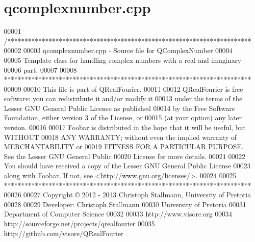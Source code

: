\hypertarget{a00113_source}{\section{qcomplexnumber.\+cpp}
\label{a00113_source}
}

\begin{DoxyCode}
00001 \textcolor{comment}{/***********************************************************************}
00002 \textcolor{comment}{}
00003 \textcolor{comment}{qcomplexnumber.cpp - Source file for QComplexNumber}
00004 \textcolor{comment}{}
00005 \textcolor{comment}{Template class for handling complex numbers with a real and imaginary}
00006 \textcolor{comment}{part. }
00007 \textcolor{comment}{}
00008 \textcolor{comment}{************************************************************************}
00009 \textcolor{comment}{}
00010 \textcolor{comment}{This file is part of QRealFourier.}
00011 \textcolor{comment}{}
00012 \textcolor{comment}{QRealFourier is free software: you can redistribute it and/or modify it}
00013 \textcolor{comment}{under the terms of the Lesser GNU General Public License as published}
00014 \textcolor{comment}{by the Free Software Foundation, either version 3 of the License, or}
00015 \textcolor{comment}{(at your option) any later version.}
00016 \textcolor{comment}{}
00017 \textcolor{comment}{Foobar is distributed in the hope that it will be useful, but WITHOUT}
00018 \textcolor{comment}{ANY WARRANTY; without even the implied warranty of MERCHANTABILITY or}
00019 \textcolor{comment}{FITNESS FOR A PARTICULAR PURPOSE.  See the Lesser GNU General Public}
00020 \textcolor{comment}{License for more details.}
00021 \textcolor{comment}{}
00022 \textcolor{comment}{You should have received a copy of the Lesser GNU General Public License}
00023 \textcolor{comment}{along with Foobar.  If not, see <http://www.gnu.org/licenses/>.}
00024 \textcolor{comment}{}
00025 \textcolor{comment}{************************************************************************}
00026 \textcolor{comment}{}
00027 \textcolor{comment}{Copyright © 2012 - 2013 Christoph Stallmann, University of Pretoria}
00028 \textcolor{comment}{}
00029 \textcolor{comment}{Developer: Christoph Stallmann}
00030 \textcolor{comment}{University of Pretoria}
00031 \textcolor{comment}{Department of Computer Science}
00032 \textcolor{comment}{}
00033 \textcolor{comment}{http://www.visore.org}
00034 \textcolor{comment}{http://sourceforge.net/projects/qrealfourier}
00035 \textcolor{comment}{http://github.com/visore/QRealFourier}

\end{DoxyCode}
